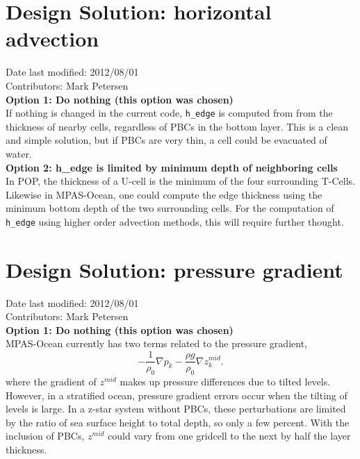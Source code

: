 \documentclass[11pt]{report}
\begin{document}
\section{Design Solution: horizontal advection}
Date last modified: 2012/08/01 \\
Contributors: Mark Petersen \\

{\bf Option 1: Do nothing (this option was chosen)}\\

If nothing is changed in the current code, {\tt h\_edge} is computed from from the thickness of nearby cells, regardless of PBCs in the bottom layer.  This is a clean and simple solution, but if PBCs are very thin, a cell could be evacuated of water.\\

{\bf Option 2: h\_edge is limited by minimum depth of neighboring cells}\\

In POP, the thickness of a U-cell is the minimum of the four surrounding T-Cells.  Likewise in MPAS-Ocean, one could compute the edge thickness using the minimum bottom depth of the two surrounding cells.  For the computation of {\tt h\_edge} using higher order advection methods, this will require further thought.

\section{Design Solution: pressure gradient}
Date last modified: 2012/08/01 \\
Contributors: Mark Petersen \\

{\bf Option 1: Do nothing (this option was chosen)}\\

MPAS-Ocean currently has two terms related to the pressure gradient,
\begin{equation}
- \frac{1}{\rho_0}\nabla p_k  - \frac{\rho g}{\rho_0}\nabla z^{mid}_k.
\end{equation}
where the gradient of $z^{mid}$ makes up pressure differences due to tilted levels.  However, in a stratified ocean, pressure gradient errors occur when the tilting of levels is large.  In a z-star system without PBCs, these perturbations are limited by the ratio of sea surface height to total depth, so only a few percent.  With the inclusion of PBCs, $z^{mid}$ could vary from one gridcell to the next by half the layer thickness.\\
\end{document}
